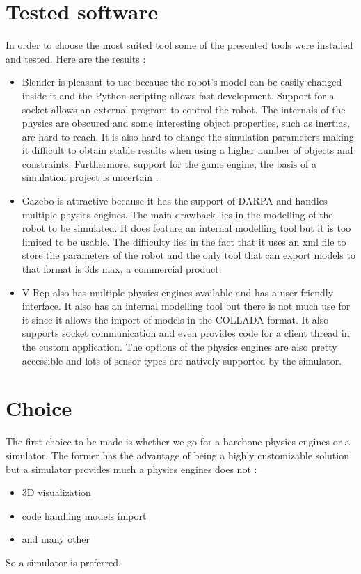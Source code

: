 \section{Tested software}
In order to choose the most suited tool some of the presented tools were installed and tested. Here are the results :
\begin{itemize}
\item Blender is pleasant to use because the robot's model can be easily changed inside it and the Python scripting allows fast development. Support for a socket allows an external program to control the robot. The internals of the physics are obscured and some interesting object properties, such as inertias, are hard to reach. It is also hard to change the simulation parameters making it difficult to obtain stable results when using a higher number of objects and constraints. Furthermore, support for the game engine, the basis of a simulation project is uncertain \cite{blender_roadmap}.

\item Gazebo is attractive because it has the support of DARPA and handles multiple physics engines. The main drawback lies in the modelling of the robot to be simulated. It does feature an internal modelling tool but it is too limited to be usable. The difficulty lies in the fact that it uses an xml file to store the parameters of the robot and the only tool that can export models to that format is 3ds max, a commercial product.

\item V-Rep also has multiple physics engines available and has a user-friendly interface. It also has an internal modelling tool but there is not much use for it since it allows the import of models in the COLLADA format. It also supports socket communication and even provides code for a client thread in the custom application. The options of the physics engines are also pretty accessible and lots of sensor types are natively supported by the simulator.
\end{itemize}

\section{Choice}
The first choice to be made is whether we go for a barebone physics engines or a simulator. The former has the advantage of being a highly customizable solution but a simulator provides much a physics engines does not :\begin{itemize}
\item 3D visualization
\item code handling models import
\item and many other
\end{itemize}
So a simulator is preferred. 

